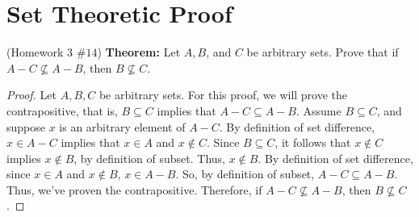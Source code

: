 \documentclass[12pt]{amsart}
\begin{document}
\section{Set Theoretic Proof}
{(Homework 3 $\#14$) }
\textbf{Theorem:}{ Let $A, B$, and $C$ be arbitrary sets. Prove that if $A-C \nsubseteq A-B$, then $B \nsubseteq C$.}
\begin{proof}
Let $A, B, C$ be arbitrary sets. For this proof, we will prove the contrapositive, that is, $B \subseteq C$ implies that $A-C \subseteq A-B$. Assume $B \subseteq C$, and suppose $x$ is an arbitrary element of $A - C$. By definition of set difference, $x \in A - C$ implies that $x \in A$ and $x \not \in C$. Since $B \subseteq C$, it follows that $x \not \in C$ implies $x \not \in B$, by definition of subset. Thus, $x \not \in B$.
By definition of set difference, since $x \in A$ and $x \not \in B$, $x \in A-B$. So, by definition of subset, $A - C \subseteq A - B$. Thus, we've proven the contrapositive. Therefore, if $A - C \not\subseteq A - B$, then $ B \not\subseteq C$.
\end{proof}
\end{document}
